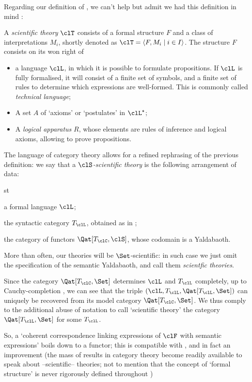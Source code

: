 \documentclass[a4paper]{../birkjour}
\begin{document}
Regarding our definition of \science, we can't help but admit we had this definition in mind \cite[2.1]{biologia}:
\begin{definition}
  A \emph{scientific theory} $\clT$ consists of a formal structure $F$ and a class of interpretations $M_i$, shortly denoted as $\clT=\langle F,M_i\mid i\in I\rangle$. The structure $F$ consists on its won right of 
  \begin{itemize}
    \item a language $\clL$, in which it is possible to formulate propositions. If $\clL$ is fully formalised, it will consist of a finite set of symbols, and a finite set of rules to determine which expressions are well-formed. This is commonly called \emph{technical language};
    \item A set $A$ of `axioms' or `postulates' in $\clL^\star$;
    \item A \emph{logical apparatus} $R$, whose elements are rules of inference and logical axioms, allowing to prove propositions.
  \end{itemize}
\end{definition}
The language of category theory allows for a refined rephrasing of the previous definition: we say that a \emph{$\clS$-scientific theory} is the following arrangement of data:
\begin{enumtag}{st}
\item a formal language $\clL$;
\item the syntactic category $T_\clL$, obtained as in \cite{lambek1988introduction};
\item the category of functors $\Qat[T_\clC, \clS]$, whose codomain is a Yaldabaoth.
\end{enumtag}
More than often, our theories will be $\Set$-scientific: in such case we just omit the specification of the semantic Yaldabaoth, and call them \emph{scientfic theories}.

Since the category $\Qat[T_\clC, \Set]$ determines $\clL$ and $T_\clL$ completely, up to Cauchy-completion \cite{borceuso-cauchy}, we can see that the triple $(\clL, T_\clL, \Qat[T_\clL,\Set])$ can uniquely be recovered from its model category $\Qat[T_\clC, \Set]$. We thus comply to the additional abuse of notation to call `scientific theory' the category $\Qat[T_\clL,\Set]$ for some $T_\clL$.

So, a `coherent correspondence linking expressions of $\clF$ with semantic expressions' boils down to a functor; this is compatible with \cite[2.1]{biologia}, and in fact an improvement (the mass of results in category theory become readily available to speak about --scientific-- theories; not to mention that the concept of `formal structure' is never rigorously defined throughout \cite{biologia})
\end{document}
